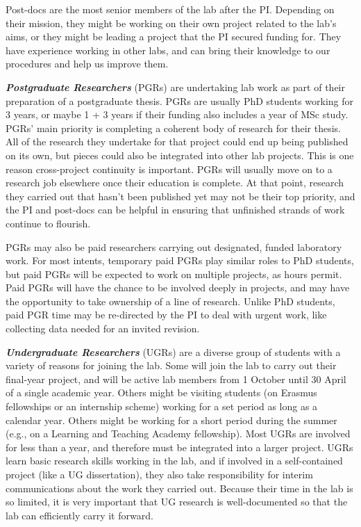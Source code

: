 \documentclass[
  12pt,
]{book}
\begin{document}
Post-docs are the most senior members of the lab after the PI. Depending on their mission, they might be working on their own project related to the lab's aims, or they might be leading a project that the PI secured funding for. They have experience working in other labs, and can bring their knowledge to our procedures and help us improve them.

\textbf{\emph{Postgraduate Researchers}} (PGRs) are undertaking lab work as part of their preparation of a postgraduate thesis. PGRs are usually PhD students working for 3 years, or maybe 1 + 3 years if their funding also includes a year of MSc study. PGRs' main priority is completing a coherent body of research for their thesis. All of the research they undertake for that project could end up being published on its own, but pieces could also be integrated into other lab projects. This is one reason cross-project continuity is important. PGRs will usually move on to a research job elsewhere once their education is complete. At that point, research they carried out that hasn't been published yet may not be their top priority, and the PI and post-docs can be helpful in ensuring that unfinished strands of work continue to flourish.

PGRs may also be paid researchers carrying out designated, funded laboratory work. For most intents, temporary paid PGRs play similar roles to PhD students, but paid PGRs will be expected to work on multiple projects, as hours permit. Paid PGRs will have the chance to be involved deeply in projects, and may have the opportunity to take ownership of a line of research. Unlike PhD students, paid PGR time may be re-directed by the PI to deal with urgent work, like collecting data needed for an invited revision.

\textbf{\emph{Undergraduate Researchers}} (UGRs) are a diverse group of students with a variety of reasons for joining the lab. Some will join the lab to carry out their final-year project, and will be active lab members from 1 October until 30 April of a single academic year. Others might be visiting students (on Erasmus fellowships or an internship scheme) working for a set period as long as a calendar year. Others might be working for a short period during the summer (e.g., on a Learning and Teaching Academy fellowship). Most UGRs are involved for less than a year, and therefore must be integrated into a larger project. UGRs learn basic research skills working in the lab, and if involved in a self-contained project (like a UG dissertation), they also take responsibility for interim communications about the work they carried out. Because their time in the lab is so limited, it is very important that UG research is well-documented so that the lab can efficiently carry it forward.
\end{document}
